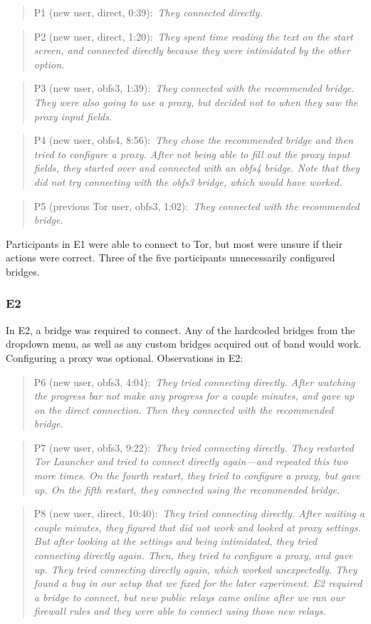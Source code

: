 \documentclass[USenglish,oneside,twocolumn]{article}
\newcommand{\pquote}[2]{
\begin{quotation}
\noindent #1:~\textit{#2}
\end{quotation}
}
\begin{document}
\pquote{P1 (new user, direct, 0:39)}{They connected directly.}

\pquote{P2 (new user, direct, 1:20)}{They spent time reading the text on the start screen, and connected directly because they were intimidated by the other option.}

\pquote{P3 (new user, obfs3, 1:39)}{They connected with the recommended bridge. They were also going to use a proxy, but decided not to when they saw the proxy input fields.}

\pquote{P4 (new user, obfs4, 8:56)}{They chose the recommended bridge and then tried to configure a proxy. After not being able to fill out the proxy input fields, they started over and connected with an obfs4 bridge. Note that they did not try connecting with the obfs3 bridge, which would have worked.}

\pquote{P5 (previous Tor user, obfs3, 1:02)}{They connected with the recommended bridge.}

Participants in E1 were able to connect to Tor, but most were unsure if their actions were correct. Three of the five participants unnecessarily configured bridges. 

\subsubsection{E2} 
In E2, a bridge was required to connect. Any of the hardcoded bridges from the dropdown menu, as well as any custom bridges acquired out of band would work. Configuring a proxy was optional.
Observations in E2: 

\pquote{P6 (new user, obfs3, 4:04)}{They tried connecting directly. After watching the progress bar not make any progress for a couple minutes, and gave up on the direct connection. Then they connected with the recommended bridge.}

\pquote{P7 (new user, obfs3, 9:22)}{They tried connecting directly. They restarted Tor Launcher and tried to connect directly again---and repeated this two more times. On the fourth restart, they tried to configure a proxy, but gave up. On the fifth restart, they connected using the recommended bridge.}

\pquote{P8 (new user, direct, 10:40)}{They tried connecting directly. After waiting a couple minutes, they figured that did not work and looked at proxy settings. But after looking at the settings and being intimidated, they tried connecting directly again. Then, they tried to configure a proxy, and gave up. They tried connecting directly again, which worked unexpectedly. They found a bug in our setup that we fixed for the later experiment. E2 required a bridge to connect, but new public relays came online after we ran our firewall rules and they were able to connect using those new relays. }
\end{document}
